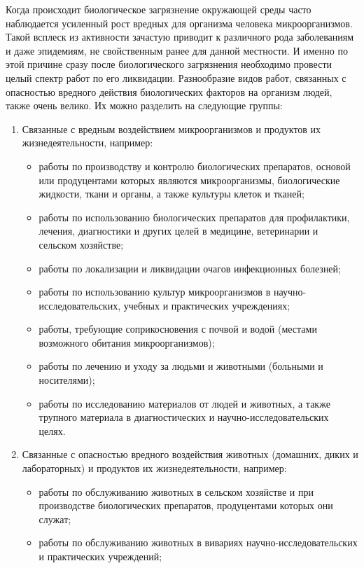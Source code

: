 \documentclass[a4paper, 12pt]{extarticle}
\begin{document}
Когда происходит биологическое загрязнение окружающей среды часто наблюдается усиленный рост вредных для организма человека микроорганизмов. Такой всплеск из активности зачастую приводит к различного рода заболеваниям и даже эпидемиям, не свойственным ранее для данной местности. И именно по этой причине сразу после биологического загрязнения необходимо провести целый спектр работ по его ликвидации. Разнообразие видов работ, связанных с опасностью вредного действия биологических факторов на организм людей, также очень велико. Их можно разделить на следующие группы:
\begin{enumerate}
    \item Связанные с вредным воздействием микроорганизмов и продуктов их жизнедеятельности, например:
          \begin{itemize}
              \item работы по производству и контролю биологических препаратов, основой или продуцентами которых являются микроорганизмы, биологические жидкости, ткани и органы, а также культуры клеток и тканей;
              \item работы по использованию биологических препаратов для профилактики, лечения, диагностики и других целей в медицине, ветеринарии и сельском хозяйстве;
              \item работы по локализации и ликвидации очагов инфекционных болезней;
              \item работы по использованию культур микроорганизмов в научно-исследовательских, учебных и практических учреждениях;
              \item работы, требующие соприкосновения с почвой и водой (местами возможного обитания микроорганизмов);
              \item работы по лечению и уходу за людьми и животными (больными и носителями);
              \item работы по исследованию материалов от людей и животных, а также трупного материала в диагностических и научно-исследовательских целях.
          \end{itemize}
    \item Связанные с опасностью вредного воздействия животных (домашних, диких и лабораторных) и продуктов их жизнедеятельности, например:
          \begin{itemize}
              \item работы по обслуживанию животных в сельском хозяйстве и при производстве биологических препаратов, продуцентами которых они служат;
              \item работы по обслуживанию животных в вивариях научно-исследовательских и практических учреждений;

\end{itemize}
\end{enumerate}
\end{document}

